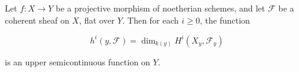 Let $f: X \to Y$ be a projective morphism of noetherian schemes, and let $\mathcal{F}$ be a coherent sheaf on $X$, flat over $Y$. Then for each $i \geq 0$, the function

$$h^i(y, \mathcal{F}) = \dim_{k(y)} H^i(X_y, \mathcal{F}_y)$$

is an upper semicontinuous function on $Y$.
